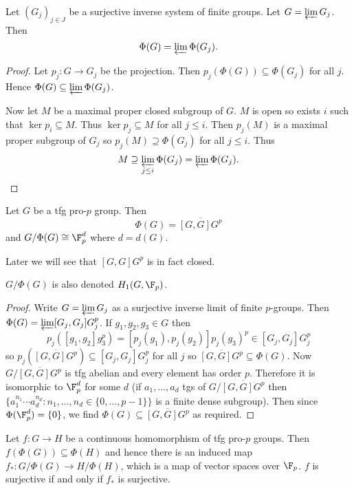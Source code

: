 \documentclass[a4paper]{article}
\begin{document}
\begin{proposition}
  Let \((G_j)_{j \in J}\) be a surjective inverse system of finite groups. Let \(G = \varprojlim G_j\). Then
  \[
    \Phi(G) = \varprojlim \Phi(G_j).
  \]
\end{proposition}

\begin{proof}
  Let \(p_j: G \to G_j\) be the projection. Then \(p_j(\Phi(G)) \subseteq \Phi(G_j)\) for all \(j\). Hence \(\Phi(G) \subseteq \varprojlim \Phi(G_j)\).

  Now let \(M\) be a maximal proper closed subgroup of \(G\). \(M\) is open so exists \(i\) such that \(\ker p_i \subseteq M\). Thus \(\ker p_j \subseteq M\) for all \(j \leq i\). Then \(p_j(M)\) is a maximal proper subgroup of \(G_j\) so \(p_j(M) \supseteq \Phi(G_j)\) for all \(j \leq i\). Thus
  \[
    M \supseteq \varprojlim_{j \leq i} \Phi(G_j) = \varprojlim \Phi(G_j).
  \]
\end{proof}

\begin{proposition}
  Let \(G\) be a tfg pro-\(p\) group. Then
  \[
    \Phi(G) = \overline{[G, G] G^p}
  \]
  and \(G/\Phi(G) \cong \F_p^d\) where \(d = d(G)\).
\end{proposition}

Later we will see that \([G, G] G^p\) is in fact closed.

\begin{note}
  \(G/\Phi(G)\) is also denoted \(H_1(G, \F_p)\).
\end{note}

\begin{proof}
  Write \(G = \varprojlim G_j\) as a surjective inverse limit of finite \(p\)-groups. Then \(\Phi(G) = \varprojlim [G_j, G_j] G_j^p\). If \(g_1, g_2, g_3 \in G\) then
  \[
    p_j([g_1, g_2]g_3^p) = [p_j(g_1), p_j(g_2)]p_j(g_3)^p \in [G_j, G_j] G_j^p
  \]
  so \(p_j(\overline{[G, G] G^p}) \subseteq [G_j, G_j] G_j^p\) for all \(j\) so \(\overline{[G, G] G^p} \subseteq \Phi(G)\). Now \(G/\overline{[G, G] G^p}\) is tfg abelian and every element has order \(p\). Therefore it is isomorphic to \(\F_p^d\) for some \(d\) (if \(a_1, \dots, a_d\) tgs of \(G/\overline{[G, G]G^p}\) then \(\{a_1^{n_1} \cdots a_d^{n_d}: n_1, \dots, n_d \in \{0, \dots, p - 1\}\}\) is a finite dense subgroup). Then since \(\Phi(\F_p^d) = \{0\}\), we find \(\Phi(G) \subseteq \overline{[G, G] G^p}\) as required.
\end{proof}

\begin{corollary}
  Let \(f: G \to H\) be a continuous homomorphism of tfg pro-\(p\) groups. Then \(f(\Phi(G)) \subseteq \Phi(H)\) and hence there is an induced map \(f_*: G/\Phi(G) \to H/\Phi(H)\), which is a map of vector spaces over \(\F_p\). \(f\) is surjective if and only if \(f_*\) is surjective.
\end{corollary}
\end{document}

